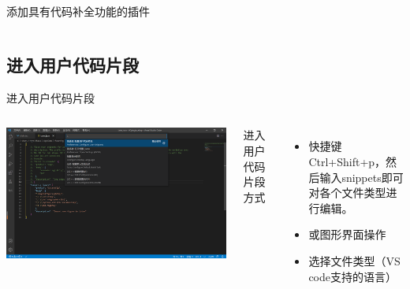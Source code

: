 \documentclass{beamer}
\begin{document}
\begin{frame}{添加具有代码补全功能的插件}
\begin{columns}
    \end{columns}
\end{frame}

\subsection{进入用户代码片段}
\begin{frame}{进入用户代码片段}
    \begin{columns}
        \begin{minipage}[c][\textheight][c]{\linewidth}
            \centering
            \includegraphics[scale=0.08]{pic/open.png}
        \end{minipage}
        进入用户代码片段方式
        \begin{itemize}
            \item 快捷键Ctrl+Shift+p，然后输入snippets即可对各个文件类型进行编辑。
            \item 或图形界面操作
            \item 选择文件类型（VS code支持的语言）
        \end{itemize}
    \end{columns}
\end{frame}
\end{document}
